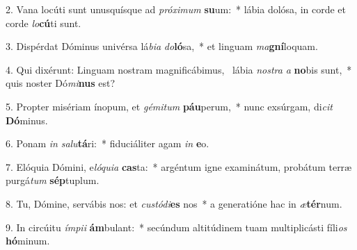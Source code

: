 2. Vana locúti sunt unusquísque ad \textit{pró}\textit{xi}\textit{mum} \textbf{su}um:~*  lábia dolósa, in corde et corde \textit{lo}\textbf{cú}ti sunt.\

3. Dispérdat Dóminus univérsa lá\textit{bi}\textit{a} \textit{do}\textbf{ló}sa,~*  et linguam \textit{ma}\textbf{gní}loquam.\

4. Qui dixérunt: Linguam nostram magnificábimus, \dag\  lábia \textit{nos}\textit{tra} \textit{a} \textbf{no}bis sunt,~*  quis noster Dó\textit{mi}\textbf{nus} est?\

5. Propter misériam ínopum, et \textit{gé}\textit{mi}\textit{tum} \textbf{páu}perum,~*  nunc exsúrgam, di\textit{cit} \textbf{Dó}minus.\

6. Ponam \textit{in} \textit{sa}\textit{lu}\textbf{tá}ri:~*  fiduciáliter agam \textit{in} \textbf{e}o.\

7. Elóquia Dómini, e\textit{ló}\textit{qui}\textit{a} \textbf{cas}ta:~*  argéntum igne examinátum, probátum terræ purgá\textit{tum} \textbf{sép}tuplum.\

8. Tu, Dómine, servábis nos: et \textit{cus}\textit{tó}\textit{di}\textbf{es} nos~*  a generatióne hac in \textit{æ}\textbf{tér}num.\

9. In circúitu \textit{ím}\textit{pi}\textit{i} \textbf{ám}bulant:~*  secúndum altitúdinem tuam multiplicásti fíli\textit{os} \textbf{hó}minum.\

